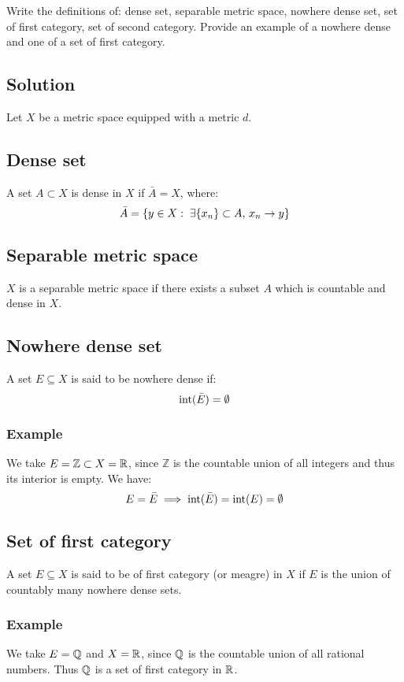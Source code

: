 
\question
Write the definitions of: dense set, separable metric space, nowhere dense set, set of first category, set of second category. Provide an example of a nowhere dense and one of a set of first category.

\subsection*{Solution}

Let $X$ be a metric space equipped with a metric $d$.

\subsection{Dense set}
A set $A \subset X$ is dense in $X$ if $\bar{A} = X$, where:    
\[
    \bar{A} = \{ y \in X : \; \exists \{ x_n \} \subset A, \, x_n \to y \}    
\]

\subsection{Separable metric space}
$X$ is a separable metric space if there exists a subset $A$ which is countable and dense in $X$.

\subsection{Nowhere dense set}
A set $E\subseteq X$ is said to be nowhere dense if:
\[
    \operatorname*{int}( \bar{E}) = \emptyset
\]

\subsubsection{Example}
We take $E=\mathbb{Z} \subset X=\mathbb{R}$, since $\mathbb{Z}$ is the countable union of all integers and thus its interior is empty. We have:
\[
    E = \bar{E} \implies \operatorname*{int}( \bar{E}) = \operatorname*{int}(E)=\emptyset      
\]

\subsection{Set of first category}
A set $E\subseteq X$ is said to be of first category (or meagre) in $X$ if $E$ is the union of countably many nowhere dense sets. 

\subsubsection{Example}
We take $E=\mathbb{Q}$ and $X=\mathbb{R}$, since $\mathbb{Q}$ is the countable union of all rational numbers. Thus $\mathbb{Q}$ is a set of first category in $\mathbb{R}$.

